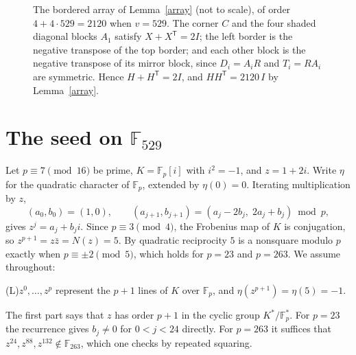 \documentclass[11pt]{article}
\theoremstyle{remark}
\newcommand{\F}{\mathbb F}
\begin{document}
\begin{figure}[t]
\centering
{}
\caption{The bordered array of Lemma~\ref{array} (not to scale), of order $4+4\cdot529=2120$ when $v=529$. The corner $C$ and the four shaded diagonal blocks $A_1$ satisfy $X+X^{\mathsf T}=2I$; the left border is the negative transpose of the top border; and each other block is the negative transpose of its mirror block, since $D_i=A_iR$ and $T_i=RA_i$ are symmetric. Hence $H+H^{\mathsf T}=2I$, and $HH^{\mathsf T}=2120\,I$ by Lemma~\ref{array}.}\label{fig:array}
\end{figure}

\section{The seed on \texorpdfstring{$\F_{529}$}{F529}}\label{sec:seed}
Let $p\equiv7\pmod{16}$ be prime, $K=\F_p[i]$ with $i^2=-1$, and $z=1+2i$. Write $\eta$ for the quadratic character of $\F_p$, extended by $\eta(0)=0$. Iterating multiplication by $z$,
\[
(a_0,b_0)=(1,0),\qquad(a_{j+1},b_{j+1})=(a_j-2b_j,\;2a_j+b_j)\bmod p,
\]
gives $z^j=a_j+b_ji$. Since $p\equiv3\pmod4$, the Frobenius map of $K$ is conjugation, so $z^{p+1}=z\bar z=N(z)=5$. By quadratic reciprocity $5$ is a nonsquare modulo $p$ exactly when $p\equiv\pm2\pmod5$, which holds for $p=23$ and $p=263$. We assume throughout:
\begin{center}
(L)\quad $z^0,\dots,z^p$ represent the $p+1$ lines of $K$ over $\F_p$, and $\eta(z^{p+1})=\eta(5)=-1$.
\end{center}
The first part says that $z$ has order $p+1$ in the cyclic group $K^*/\F_p^*$. For $p=23$ the recurrence gives $b_j\ne0$ for $0<j<24$ directly. For $p=263$ it suffices that $z^{24},z^{88},z^{132}\notin\F_{263}$, which one checks by repeated squaring.
\end{document}
